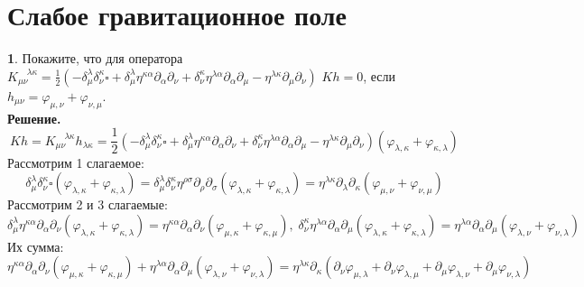 \documentclass[12pt]{article}
\theoremstyle{definition}
\newtheorem{zad}{}[section]
\begin{document}
\section{Слабое гравитационное поле}
\begin{zad}
Покажите, что для оператора $K_{\mu\nu}^{\quad\lambda\kappa}=\frac{1}{2}(-\delta^\lambda_\mu\delta^\kappa_\nu\square+\delta_\mu^\lambda\eta^{\kappa\alpha}\partial_\alpha\partial_\nu+\delta^\kappa_\nu\eta^{\lambda\alpha}\partial_\alpha\partial_\mu-\eta^{\lambda\kappa}\partial_\mu\partial_\nu)$ $Kh = 0$, если $h_{\mu\nu} = \varphi_{\mu,\nu} + \varphi_{\nu,\mu}$.\\
\textbf{Решение.}\\
\begin{equation}
    Kh=K_{\mu\nu}^{\quad\lambda\kappa}h_{\lambda\kappa}=\frac{1}{2}(-\delta^\lambda_\mu\delta^\kappa_\nu\square+\delta_\mu^\lambda\eta^{\kappa\alpha}\partial_\alpha\partial_\nu+\delta^\kappa_\nu\eta^{\lambda\alpha}\partial_\alpha\partial_\mu-\eta^{\lambda\kappa}\partial_\mu\partial_\nu)(\varphi_{\lambda,\kappa} + \varphi_{\kappa,\lambda})
\end{equation}
Рассмотрим 1 слагаемое:
\begin{equation}
    \delta^\lambda_\mu\delta^\kappa_\nu\square(\varphi_{\lambda,\kappa} + \varphi_{\kappa,\lambda})=\delta^\lambda_\mu\delta^\kappa_\nu\eta^{\rho\sigma}\partial_\rho\partial_\sigma(\varphi_{\lambda,\kappa} + \varphi_{\kappa,\lambda})=\eta^{\lambda\kappa}\partial_\lambda\partial_\kappa(\varphi_{\mu,\nu} + \varphi_{\nu,\mu})
\end{equation}
Рассмотрим 2 и 3 слагаемые:
\begin{equation*}
    \delta_\mu^\lambda\eta^{\kappa\alpha}\partial_\alpha\partial_\nu(\varphi_{\lambda,\kappa} + \varphi_{\kappa,\lambda})=\eta^{\kappa\alpha}\partial_\alpha\partial_\nu(\varphi_{\mu,\kappa} + \varphi_{\kappa,\mu}),\;\delta^\kappa_\nu\eta^{\lambda\alpha}\partial_\alpha\partial_\mu(\varphi_{\lambda,\kappa} + \varphi_{\kappa,\lambda})=\eta^{\lambda\alpha}\partial_\alpha\partial_\mu(\varphi_{\lambda,\nu} + \varphi_{\nu,\lambda})
\end{equation*}
Их сумма:
\begin{equation}
    \eta^{\kappa\alpha}\partial_\alpha\partial_\nu(\varphi_{\mu,\kappa} + \varphi_{\kappa,\mu})+\eta^{\lambda\alpha}\partial_\alpha\partial_\mu(\varphi_{\lambda,\nu} + \varphi_{\nu,\lambda})=\eta^{\lambda\kappa}\partial_\kappa(\partial_\nu\varphi_{\mu,\lambda}+\partial_\nu\varphi_{\lambda,\mu}+\partial_\mu\varphi_{\lambda,\nu}+\partial_\mu\varphi_{\nu,\lambda})

\end{equation}
\end{zad}
\end{document}
